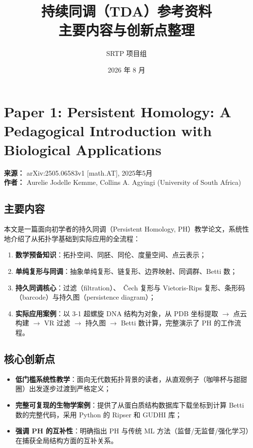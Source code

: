 \documentclass[11pt,a4paper]{article}
\title{\textbf{持续同调（TDA）参考资料\\主要内容与创新点整理}}
\author{SRTP 项目组}
\date{2026 年 8 月}
\begin{document}
\maketitle
\tableofcontents
\newpage

\section{Paper 1: Persistent Homology: A Pedagogical Introduction with Biological Applications}

\textbf{来源：} arXiv:2505.06583v1 [math.AT], 2025年5月 \\
\textbf{作者：} Aurelie Jodelle Kemme, Collins A. Agyingi (University of South Africa)

\subsection*{主要内容}
本文是一篇面向初学者的持久同调（Persistent Homology, PH）教学论文，系统性地介绍了从拓扑学基础到实际应用的全流程：

\begin{enumerate}[nosep]
  \item \textbf{数学预备知识}：拓扑空间、同胚、同伦、度量空间、点云表示；
  \item \textbf{单纯复形与同调}：抽象单纯复形、链复形、边界映射、同调群、Betti 数；
  \item \textbf{持久同调核心}：过滤（filtration）、~Čech 复形与 Vietoris-Rips 复形、条形码（barcode）与持久图（persistence diagram）；
  \item \textbf{实际应用案例}：以 3-1 超螺旋 DNA 结构为对象，从 PDB 坐标提取 $\to$ 点云构建 $\to$ VR 过滤 $\to$ 持久图 $\to$ Betti 数计算，完整演示了 PH 的工作流程。
\end{enumerate}

\subsection*{核心创新点}
\begin{itemize}[nosep]
  \item \textbf{低门槛系统性教学}：面向无代数拓扑背景的读者，从直观例子（咖啡杯与甜甜圈）出发逐步过渡到严格定义；
  \item \textbf{完整可复现的生物学案例}：提供了从蛋白质结构数据库下载坐标到计算 Betti 数的完整代码，采用 Python 的 Ripser 和 GUDHI 库；
  \item \textbf{强调 PH 的互补性}：明确指出 PH 与传统 ML 方法（监督/无监督/强化学习）在捕获全局结构方面的互补关系。
\end{itemize}
\end{document}
